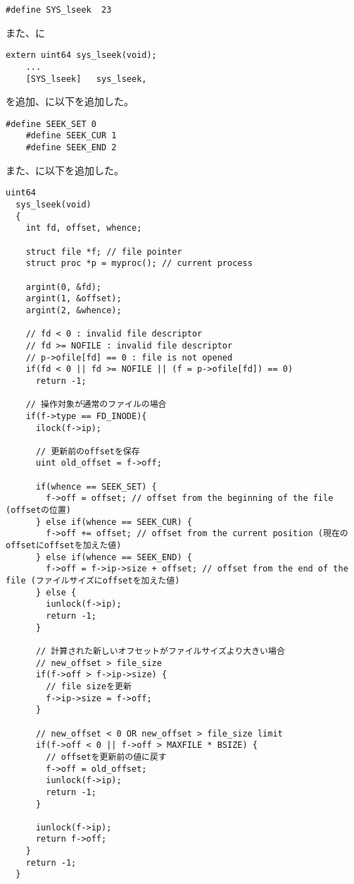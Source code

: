 \documentclass[platex,dvipdfmx, titlepage]{jlreq} %
\begin{document}
\begin{lstlisting}[caption={kernel/sysycall.h}]
    #define SYS_lseek  23
\end{lstlisting}

\noindent また、に

\begin{lstlisting}[caption={kernel/sysycall.c}]
    extern uint64 sys_lseek(void);
    ...
    [SYS_lseek]   sys_lseek,
\end{lstlisting}
\noindent を追加、に以下を追加した。

\begin{lstlisting}[caption={kernel/fcntl.h}]
    #define SEEK_SET 0
    #define SEEK_CUR 1
    #define SEEK_END 2
\end{lstlisting}

\noindent また、に以下を追加した。

\begin{lstlisting}[caption={kernel/sysfile.c}]
  uint64
  sys_lseek(void)
  {
    int fd, offset, whence;
  
    struct file *f; // file pointer
    struct proc *p = myproc(); // current process
  
    argint(0, &fd);
    argint(1, &offset);
    argint(2, &whence);
  
    // fd < 0 : invalid file descriptor
    // fd >= NOFILE : invalid file descriptor
    // p->ofile[fd] == 0 : file is not opened
    if(fd < 0 || fd >= NOFILE || (f = p->ofile[fd]) == 0)
      return -1;
  
    // 操作対象が通常のファイルの場合
    if(f->type == FD_INODE){
      ilock(f->ip);
  
      // 更新前のoffsetを保存
      uint old_offset = f->off;
  
      if(whence == SEEK_SET) {
        f->off = offset; // offset from the beginning of the file (offsetの位置)
      } else if(whence == SEEK_CUR) {
        f->off += offset; // offset from the current position (現在のoffsetにoffsetを加えた値)
      } else if(whence == SEEK_END) {
        f->off = f->ip->size + offset; // offset from the end of the file (ファイルサイズにoffsetを加えた値)
      } else {
        iunlock(f->ip);
        return -1;
      }
  
      // 計算された新しいオフセットがファイルサイズより大きい場合
      // new_offset > file_size
      if(f->off > f->ip->size) {
        // file sizeを更新
        f->ip->size = f->off;
      }
  
      // new_offset < 0 OR new_offset > file_size limit
      if(f->off < 0 || f->off > MAXFILE * BSIZE) {
        // offsetを更新前の値に戻す
        f->off = old_offset;
        iunlock(f->ip);
        return -1;
      }
  
      iunlock(f->ip);
      return f->off;
    }
    return -1;
  }
\end{lstlisting}
\end{document}
